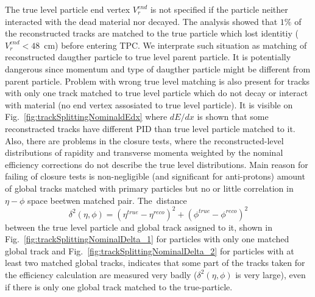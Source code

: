 The true level particle end vertex $V_r^{end}$ is not specified if the particle neither interacted with the dead material nor decayed. The analysis showed that $1\%$ of the reconstructed tracks are matched to the true particle which lost identitiy ($V_r^{end}<48$~cm) before entering TPC. We interprate such situation as matching of reconstructed daugther particle to true level parent particle. It is potentially dangerous since  momentum and type of daugther particle might be different from parent particle.  Problem with wrong true level matching is also present for tracks with only one track matched to true level particle which do not decay or interact with material (no end vertex assosiated to true  level particle). 
It is visible on Fig.~\ref{fig:trackSplittingNominaldEdx} where $dE/dx$ is shown that some reconstracted tracks 
have different PID than true level particle matched to it.
 Also, there are problems in the closure tests, where  the  reconstructed-level distributions of rapidity and transverse momenta weighted by the nominal efficiency corrections do not describe the true level distributions. Main reason for failing of closure tests is non-negligible (and significant   for anti-protons) amount of global tracks matched with primary particles but no or little correlation in $\eta-\phi$ space beetwen
matched pair. 
The~distance 
\begin{equation}\label{eq:tpcMatchingDeltaSquare}
\delta^{2}\left(\eta,\phi\right)=\left(\eta^{true}-\eta^{reco}\right)^2+\left(\phi^{true}-\phi^{reco}\right)^2
\end{equation}
between the true level particle and global track assigned to it, shown in Fig.~\ref{fig:trackSplittingNominalDelta_1} for particles with only one  matched global track and Fig.~\ref{fig:trackSplittingNominalDelta_2} for particles with at least two  matched global tracks, indicates that some part of the tracks taken for the efficiency calculation are measured very badly ($\delta^{2}\left(\eta,\phi\right)$ is very large), even if there is only one global track matched to the true-particle.
